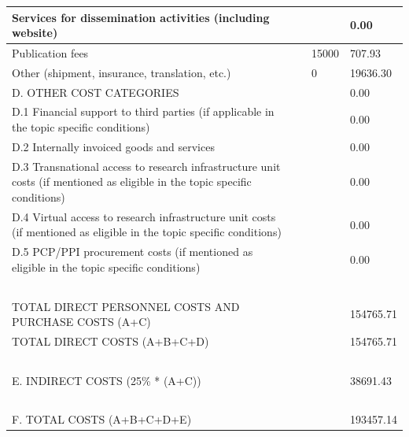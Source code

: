 \begin{table}[H]
\begin{tabular}{|l|l|l|l|}
Services for dissemination activities (including website) & ~ & ~ & 0.00 \\ \hline
Publication fees & ~ & 15000 & 707.93 \\ \hline
Other (shipment, insurance, translation, etc.) & ~ & 0 & 19636.30 \\ \hline
D. OTHER COST CATEGORIES & ~ & ~ & 0.00\\ \hline
D.1 Financial support to third parties (if applicable in the topic specific conditions) & ~ & ~ & 0.00 \\ \hline
D.2 Internally invoiced goods and services & ~ & ~ & 0.00 \\ \hline
D.3 Transnational access to research infrastructure unit costs (if mentioned as eligible in the topic specific conditions) & ~ & ~ & 0.00 \\ \hline
D.4 Virtual access to research infrastructure unit costs (if mentioned as eligible in the topic specific conditions) & ~ & ~ & 0.00 \\ \hline
D.5 PCP/PPI procurement costs (if mentioned as eligible in the topic specific conditions) & ~ & ~ & 0.00 \\ \hline
~ & ~ & ~ & ~ \\ \hline
TOTAL DIRECT PERSONNEL COSTS AND PURCHASE COSTS (A+C) & ~ & ~ & 154765.71 \\ \hline
TOTAL DIRECT COSTS (A+B+C+D) & ~ & ~ & 154765.71 \\ \hline
~ & ~ & ~ & ~ \\ \hline
E. INDIRECT COSTS (25\% * (A+C)) & ~ & ~ & 38691.43 \\ \hline
~ & ~ & ~ & ~ \\ \hline
F. TOTAL COSTS (A+B+C+D+E) & ~ & ~ & 193457.14 \\ \hline
\end{tabular}
\end{table}

